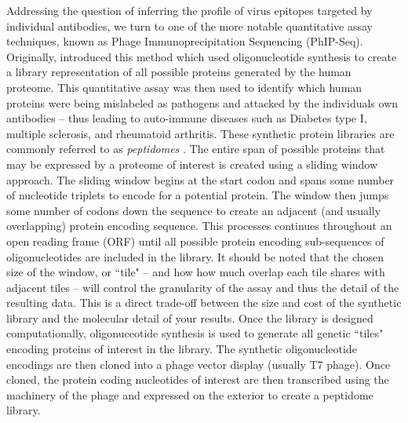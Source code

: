 \documentclass{article}
\begin{document}
Addressing the question of inferring the profile of virus epitopes targeted by individual antibodies, we turn to one of the more notable quantitative assay techniques, known as Phage Immunoprecipitation Sequencing (PhIP-Seq).
Originally, \citet{Larman2011} introduced this method which used oligonucleotide synthesis to create a library representation of all possible proteins generated by the human proteome.
This quantitative assay was then used to identify which human proteins were being mislabeled as pathogens and attacked by the individuals own antibodies -- thus leading to auto-immune diseases such as Diabetes type I, multiple sclerosis, and rheumatoid arthritis.
These synthetic protein libraries are commonly referred to as \textit{peptidomes} \citep{Mohan2018}.
The entire span of possible proteins that may be expressed by a proteome of interest is created using a sliding window approach.
The sliding window begins at the start codon and spans some number of nucleotide triplets to encode for a potential protein.
The window then jumps some number of codons down the sequence to create an adjacent (and usually overlapping) protein encoding sequence.
This processes continues throughout an open reading frame (ORF) until all possible protein encoding sub-sequences of oligonucleotides are included in the library.
It should be noted that the chosen size of the window, or ``tile" -- and how how much overlap each tile shares with adjacent tiles -- will control the granularity of the assay and thus the detail of the resulting data.
This is a direct trade-off between the size and cost of the synthetic library and the molecular detail of your results.
Once the library is designed computationally, oligonuceotide synthesis is used to generate all genetic ``tiles"  encoding proteins of interest in the library.
The synthetic oligonucleotide encodings are then cloned into a phage vector display (usually T7 phage). 
Once cloned, the protein coding nucleotides of interest are then transcribed using the machinery of the phage and expressed on the exterior to create a peptidome library.
\end{document}
